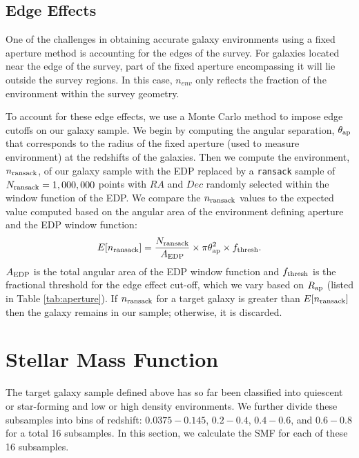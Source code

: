 \documentclass{emulateapj}
\begin{document}
\subsection{Edge Effects} \label{sec:edgeeffect}
One of the challenges in obtaining accurate galaxy environments using a fixed aperture method is accounting for the edges of the survey. For galaxies located near the edge of the survey, part of the fixed aperture encompassing it will lie outside the survey regions. In this case, $n_{env}$ only reflects the fraction of the environment within the survey geometry.

To account for these edge effects, we use a Monte Carlo method to impose edge cutoffs on our galaxy sample. We begin by computing the angular separation, $\theta_{\rm{ap}}$ that corresponds to the radius of the fixed aperture (used to measure environment) at the redshifts of the galaxies. Then we compute the environment, $n_{\rm{ransack}}$, of our galaxy sample with the EDP replaced by a \texttt{ransack} sample of $N_{\rm{ransack}} = 1,000,000$ points with $RA$ and $Dec$ randomly selected within the window function of the EDP. We compare the $n_{\rm{ransack}}$ values to the expected value computed based on the angular area of the environment defining aperture and the EDP window function: 
\begin{equation} \label{eq:ransack}
E[n_{\rm{ransack}}] = \frac{N_{\rm{ransack}}}{A_{\rm{EDP}}}\times {\pi \theta_{\rm{ap}}^2} \times f_{\rm{thresh}}. 
\end{equation} 
$A_{\rm{EDP}}$ is the total angular area of the EDP window function and $f_{\rm{thresh}}$ is the fractional threshold for the edge effect cut-off, which we vary based on $R_{\rm{ap}}$ (listed in Table \ref{tab:aperture}). If $n_{\rm{ransack}}$ for a target galaxy is greater than $E[n_{\rm{ransack}}]$ then the galaxy remains in our sample; otherwise, it is discarded. 

\section{Stellar Mass Function} \label{sec:smf}
The target galaxy sample defined above has so far been classified into quiescent or star-forming and low or high density environments. We further divide these subsamples into bins of redshift: $0.0375-0.145$, $0.2-0.4$, $0.4-0.6$, and $0.6-0.8$ for a total 16 subsamples. In this section, we calculate the SMF for each of these 16 subsamples. 
\end{document}
